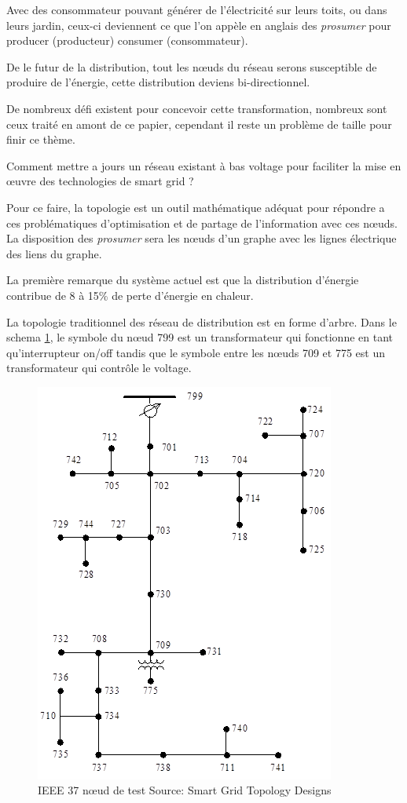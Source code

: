 Avec des consommateur pouvant générer de l'électricité sur leurs toits, ou dans leurs jardin,
ceux-ci deviennent ce que l'on appèle en anglais des \textit{prosumer} pour producer (producteur)
consumer (consommateur).

De le futur de la distribution, tout les nœuds du réseau serons susceptible de produire de l'énergie,
cette distribution deviens bi-directionnel.

De nombreux défi existent pour concevoir cette transformation, nombreux sont ceux traité en amont de ce papier,
cependant il reste un problème de taille pour finir ce thème.

Comment mettre a jours un réseau existant à bas voltage pour faciliter la mise en œuvre des technologies
de smart grid ?

Pour ce faire, la topologie est un outil mathématique adéquat pour répondre a ces problématiques d'optimisation
et de partage de l'information avec ces nœuds.
La disposition des \textit{prosumer} sera les nœuds d'un graphe avec les lignes électrique des liens du graphe.

La première remarque du système actuel est que la distribution d'énergie contribue de 8 à 15\% de perte
d'énergie en chaleur.

La topologie traditionnel des réseau de distribution est en forme d'arbre.
Dans le schema \ref{fig:ieee_radial_tree}, le symbole du nœud 799 est un transformateur qui
fonctionne en tant qu'interrupteur on/off tandis que le symbole entre les nœuds
709 et 775 est un transformateur qui contrôle le voltage.

\begin{figure}
  \includegraphics[scale=0.5]{media/ieee_radial_tree.png}
  \caption{
      IEEE 37 nœud de test\newline
      \tiny{Source:\newline
        Smart Grid Topology Designs
      }
  }
  \label{fig:ieee_radial_tree}
\end{figure}


